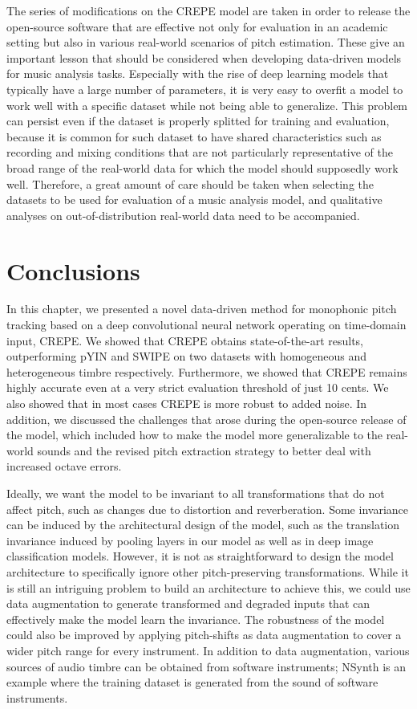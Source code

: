 The series of modifications on the CREPE model are taken in order to release the open-source software that are effective not only for evaluation in an academic setting but also in various real-world scenarios of pitch estimation.
These give an important lesson that should be considered when developing data-driven models for music analysis tasks.
Especially with the rise of deep learning models that typically have a large number of parameters, it is very easy to overfit a model to work well with a specific dataset while not being able to generalize.
This problem can persist even if the dataset is properly splitted for training and evaluation, because it is common for such dataset to have shared characteristics such as recording and mixing conditions that are not particularly representative of the broad range of the real-world data for which the model should supposedly work well.
Therefore, a great amount of care should be taken when selecting the datasets to be used for evaluation of a music analysis model, and qualitative analyses on out-of-distribution real-world data need to be accompanied.


\section{Conclusions}

In this chapter, we presented a novel data-driven method for monophonic pitch tracking based on a deep convolutional neural network operating on time-domain input, CREPE.
We showed that CREPE obtains state-of-the-art results, outperforming pYIN and SWIPE on two datasets with homogeneous and heterogeneous timbre respectively.
Furthermore, we showed that CREPE remains highly accurate even at a very strict evaluation threshold of just 10 cents.
We also showed that in most cases CREPE is more robust to added noise.
In addition, we discussed the challenges that arose during the open-source release of the model, which included how to make the model more generalizable to the real-world sounds and the revised pitch extraction strategy to better deal with increased octave errors.

Ideally, we want the model to be invariant to all transformations that do not affect pitch, such as changes due to distortion and reverberation.
Some invariance can be induced by the architectural design of the model, such as the translation invariance induced by pooling layers in our model as well as in deep image classification models.
However, it is not as straightforward to design the model architecture to specifically ignore other pitch-preserving transformations.
While it is still an intriguing problem to build an architecture to achieve this, we could use data augmentation to generate transformed and degraded inputs that can effectively make the model learn the invariance.
The robustness of the model could also be improved by applying pitch-shifts as data augmentation \cite{mcfee2015muda} to cover a wider pitch range for every instrument.
In addition to data augmentation, various sources of audio timbre can be obtained from software instruments; NSynth \cite{engel2017nsynth} is an example where the training dataset is generated from the sound of software instruments.


